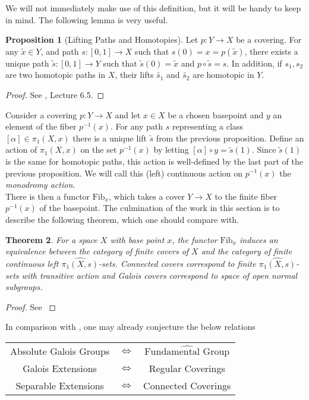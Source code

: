 \documentclass{article}
\newtheorem{theorem}{Theorem}[section]
\theoremstyle{definition}
\newtheorem{proposition}[theorem]{Proposition}
\theoremstyle{remark}
\begin{document}
We will not immediately make use of this definition, but it will be handy to keep in mind.
The following lemma is very useful.

\begin{proposition}[Lifting Paths and Homotopies]	
	Let $p: Y \to X$ be a covering. 
	For any $\widetilde{x} \in Y$, and path $s: [0,1] \to X$ such that $s(0) = x = p(\widetilde{x})$, there exists a unique path $\widetilde{s}:[0,1] \to Y$ such that $\widetilde{s}(0) = \widetilde{x}$ and $p \circ \widetilde{s} = s$.
	In addition, if $s_1, s_2$ are two homotopic paths in $X$, their lifts $\widetilde{s_1}$ and $\widetilde{s_2}$ are homotopic in $Y$.
\end{proposition}

\begin{proof}
	See \cite{FomenkoFuchs}, Lecture 6.5.
\end{proof}
		
Consider a covering $p: Y \to X$ and let $x \in X$ be a chosen basepoint and $y$ an element of the fiber $p^{-1}(x)$.
	For any path $s$ representing a class $[\alpha] \in \pi_1(X,x)$ there is a unique lift $\widetilde{s}$ from the previous proposition.
	Define an action of $\pi_1(X,x)$ on the set $p^{-1}(x)$ by letting $[\alpha] \circ y = \widetilde{s}(1)$.
	Since $\widetilde{s}(1)$ is the same for homotopic paths, this action is well-defined by the last part of the previous proposition.
	We will call this (left) continuous action on $p^{-1}(x)$ the \textit{monodromy action}.\\
	\indent There is then a functor $\text{Fib}_x$, which takes a cover $Y \to X$ to the finite fiber $p^{-1}(x)$ of the basepoint.
The culmination of the work in this section is to describe the following theorem, which one should compare with.

	\begin{theorem}
	For a space $X$ with base point $x$, the functor $\text{Fib}_x$ induces an equivalence between the category of finite covers of $X$ and the category of finite continuous left $\widehat{\pi_1(X,s)}$-sets.
	Connected covers correspond to finite $\widehat{\pi_1(X,s)}$-sets with transitive action and Galois covers correspond to space of open normal subgroups.
\end{theorem}
\begin{proof}
	See \cite{Szamuely}
\end{proof}


In comparison with , one may already conjecture the below relations
\begin{center}
\begin{tabular}{ |c c c| } 
\hline
	Absolute Galois Groups & $\Longleftrightarrow$ & $\widehat{\text{Fundamental Group}}$ \\
 
	Galois Extensions & $\Longleftrightarrow$ & Regular Coverings\\
 
	Separable Extensions & $\Longleftrightarrow$ & Connected Coverings\\
 \hline
\end{tabular}
\end{center}
\end{document}
